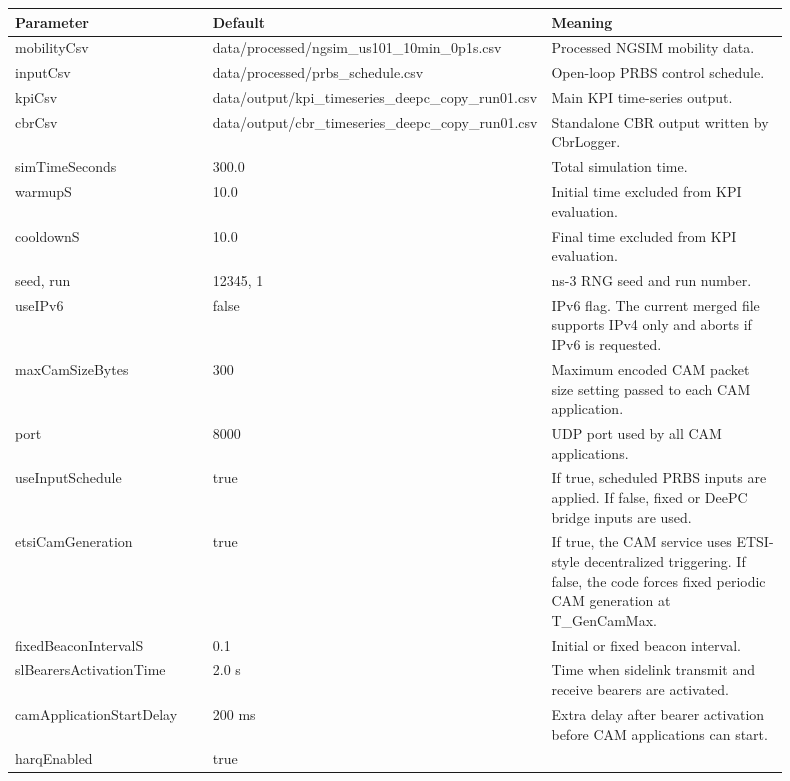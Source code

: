\documentclass[11pt]{article}
\DeclareRobustCommand{\code}[1]{\texttt{\detokenize{#1}}}
\def\code#1{#1}%
\begin{document}
\begin{center}
\begin{longtable}{L{0.28\linewidth}L{0.18\linewidth}L{0.44\linewidth}}
\toprule
Parameter & Default & Meaning \\
\midrule
\endhead
\code{mobilityCsv} & \code{data/processed/ngsim_us101_10min_0p1s.csv} &
Processed NGSIM mobility data. \\
\code{inputCsv} & \code{data/processed/prbs_schedule.csv} &
Open-loop PRBS control schedule. \\
\code{kpiCsv} & \code{data/output/kpi_timeseries_deepc_copy_run01.csv} &
Main KPI time-series output. \\
\code{cbrCsv} & \code{data/output/cbr_timeseries_deepc_copy_run01.csv} &
Standalone CBR output written by \code{CbrLogger}. \\
\code{simTimeSeconds} & \code{300.0} &
Total simulation time. \\
\code{warmupS} & \code{10.0} &
Initial time excluded from KPI evaluation. \\
\code{cooldownS} & \code{10.0} &
Final time excluded from KPI evaluation. \\
\code{seed}, \code{run} & \code{12345}, \code{1} &
ns-3 RNG seed and run number. \\
\code{useIPv6} & \code{false} &
IPv6 flag.  The current merged file supports IPv4 only and aborts if IPv6 is
requested. \\
\code{maxCamSizeBytes} & \code{300} &
Maximum encoded CAM packet size setting passed to each CAM application. \\
\code{port} & \code{8000} &
UDP port used by all CAM applications. \\
\code{useInputSchedule} & \code{true} &
If true, scheduled PRBS inputs are applied.  If false, fixed or DeePC bridge
inputs are used. \\
\code{etsiCamGeneration} & \code{true} &
If true, the CAM service uses ETSI-style decentralized triggering.  If false,
the code forces fixed periodic CAM generation at \code{T_GenCamMax}. \\
\code{fixedBeaconIntervalS} & \code{0.1} &
Initial or fixed beacon interval. \\
\code{slBearersActivationTime} & \code{2.0 s} &
Time when sidelink transmit and receive bearers are activated. \\
\code{camApplicationStartDelay} & \code{200 ms} &
Extra delay after bearer activation before CAM applications can start. \\
\code{harqEnabled} & \code{true} &

\end{longtable}
\end{center}
\end{document}
